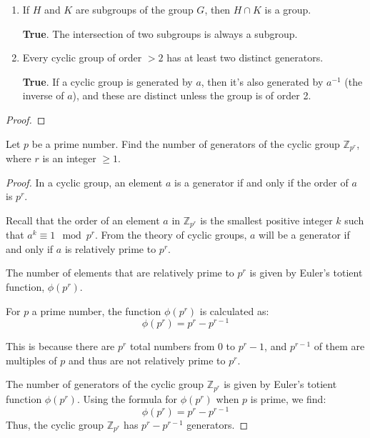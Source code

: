 \documentclass[12pt]{amsart}
\theoremstyle{definition}
\numberwithin{equation}{section}
\theoremstyle{plain}
\newcommand{\Z}{\mathbb{Z}}
\begin{document}
\begin{exercise}{39}
\begin{enumerate}[label=(\alph*.)]
\item If \(H\) and \(K\) are subgroups of the group \(G\), then \(H \cap K\) is a group.

\textbf{True}. The intersection of two subgroups is always a subgroup.

\item Every cyclic group of order \(>2\) has at least two distinct generators.

\textbf{True}. If a cyclic group is generated by \(a\), then it's also generated by \(a^{-1}\) (the inverse of \(a\)), and these are distinct unless the group is of order 2.

        \end{enumerate}
    
    \begin{proof}
        
    \end{proof}
    \end{exercise}
    \begin{exercise}{52} Let $p$ be a prime number. Find the number of generators of the cyclic group $\Z_{p^r}$, where $r$ is an integer $\geq 1$.
    \begin{proof}
        In a cyclic group, an element \(a\) is a generator if and only if the order of \(a\) is \(p^r\).

        Recall that the order of an element \(a\) in \(\Z_{p^r}\) is the smallest positive integer \(k\) such that \(a^k \equiv 1 \mod p^r\). From the theory of cyclic groups, \(a\) will be a generator if and only if \(a\) is relatively prime to \(p^r\).
        
        The number of elements that are relatively prime to \(p^r\) is given by Euler's totient function, \( \phi(p^r)\).
        
        For \( p \) a prime number, the function \( \phi(p^r) \) is calculated as:
        \[ \phi(p^r) = p^r - p^{r-1} \]
        
        This is because there are \( p^r \) total numbers from 0 to \( p^r - 1 \), and \( p^{r-1} \) of them are multiples of \( p \) and thus are not relatively prime to \( p^r \).
        
        The number of generators of the cyclic group \( \Z_{p^r} \) is given by Euler's totient function \( \phi(p^r) \). Using the formula for \( \phi(p^r) \) when \( p \) is prime, we find:
        \[ \phi(p^r) = p^r - p^{r-1} \]
        Thus, the cyclic group \( \Z_{p^r} \) has \( p^r - p^{r-1} \) generators.
        \end{proof}
    \end{exercise}
\end{document}
